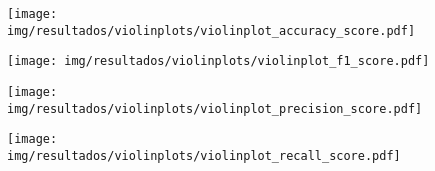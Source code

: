 \begin{figure}
	\texttt{[image: img/resultados/violinplots/violinplot\_accuracy\_score.pdf]}
	\caption{}
\end{figure}
	
\begin{figure}
	\texttt{[image: img/resultados/violinplots/violinplot\_f1\_score.pdf]}
	\caption{}
\end{figure}

\begin{figure}
	\texttt{[image: img/resultados/violinplots/violinplot\_precision\_score.pdf]}
	\caption{}
\end{figure}
	
\begin{figure}
	\texttt{[image: img/resultados/violinplots/violinplot\_recall\_score.pdf]}
	\caption{}
\end{figure}
